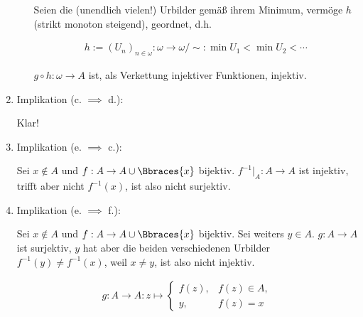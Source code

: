 \begin{solution}
\begin{enumerate}[label = \arabic*.]
\begin{enumerate}[label = \arabic*.]

    \phantom{}

    Seien die (unendlich vielen!) Urbilder gemäß ihrem Minimum, vermöge $h$ (strikt monoton steigend), geordnet, d.h.

    \begin{align*}
      h := (U_n)_{n \in \omega}:
      \omega \to \omega / \sim:
      \min U_1 < \min U_2 < \cdots
    \end{align*}

    $g \circ h: \omega \to A$ ist, als Verkettung injektiver Funktionen, injektiv.

  \end{enumerate}

  \item Implikation (c. $\implies$ d.):
  
  Klar!

  \item Implikation (e. $\implies$ c.):
  
  Sei $x \not \in A$ und $f: A \to A \cup \Bbraces{x}$ bijektiv.
  $f^{-1} |_A: A \to A$ ist injektiv, trifft aber nicht $f^{-1}(x)$, ist also nicht surjektiv.

  \item Implikation (e. $\implies$ f.):
  
  Sei $x \not \in A$ und $f: A \to A \cup \Bbraces{x}$ bijektiv.
  Sei weiters $y \in A$.
  $g: A \to A$ ist surjektiv, $y$ hat aber die beiden verschiedenen Urbilder $f^{-1}(y) \neq f^{-1}(x)$, weil $x \neq y$, ist also nicht injektiv.

  \begin{align*}
    g:
    A \to A:
    z
    \mapsto
    \begin{cases}
      f(z), & f(z) \in A, \\
      y,    & f(z) = x
    \end{cases}
  \end{align*}


\end{enumerate}
\end{solution}

